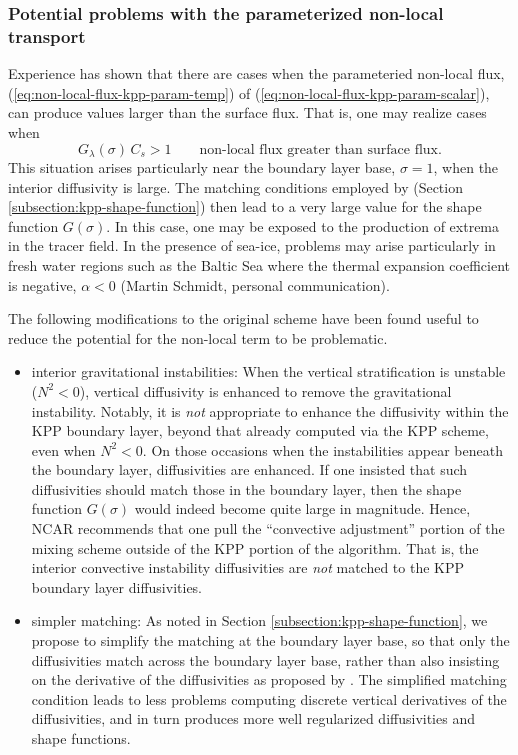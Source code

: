 \subsubsection{Potential problems with the parameterized non-local transport}

Experience has shown that there are cases when the parameteried
non-local flux, (\ref{eq:non-local-flux-kpp-param-temp}) of
(\ref{eq:non-local-flux-kpp-param-scalar}), can produce values larger
than the surface flux.  That is, one may realize cases when 
\begin{equation}
   G_{\lambda}(\sigma) \, C_{s} > 1 \qquad \mbox{non-local flux greater than surface flux.}
\end{equation}
This situation arises particularly near the boundary layer base,
$\sigma=1$, when the interior diffusivity is large.  The matching
conditions employed by \cite{LargeKPP} (Section
\ref{subsection:kpp-shape-function}) then lead to a very large value
for the shape function $G(\sigma)$.  In this case, one may be exposed
to the production of extrema in the tracer field.  In the presence of
sea-ice, problems may arise particularly in fresh water regions such
as the Baltic Sea where the thermal expansion coefficient is negative,
$\alpha < 0$ (Martin Schmidt, personal communication).

The following modifications to the original \cite{LargeKPP} scheme
have been found useful to reduce the potential for the non-local term
to be problematic. 
\begin{itemize}

\item {\sc interior gravitational instabilities}: When the vertical
 stratification is unstable ($N^{2} < 0$), vertical diffusivity is
  enhanced to remove the gravitational instability. Notably, it is
  {\it not} appropriate to enhance the diffusivity within the KPP
  boundary layer, beyond that already computed via the KPP scheme,
  even when $N^{2} < 0$.  On those occasions when the instabilities
  appear beneath the boundary layer, diffusivities are enhanced.  If
  one insisted that such diffusivities should match those in the
  boundary layer, then the shape function $G(\sigma)$ would indeed
  become quite large in magnitude.  Hence, NCAR recommends that one
  pull the ``convective adjustment'' portion of the mixing scheme
  outside of the KPP portion of the algorithm.  That is, the interior
  convective instability diffusivities are {\it not} matched to the
  KPP boundary layer diffusivities.  

\item {\sc simpler matching}: As noted in Section
  \ref{subsection:kpp-shape-function}, we propose to simplify the
  matching at the boundary layer base, so that only the diffusivities
  match across the boundary layer base, rather than also insisting on
  the derivative of the diffusivities as proposed by \cite{LargeKPP}.
  The simplified matching condition leads to less problems computing
  discrete vertical derivatives of the diffusivities, and in turn
  produces more well regularized diffusivities and shape functions.

\end{itemize}


